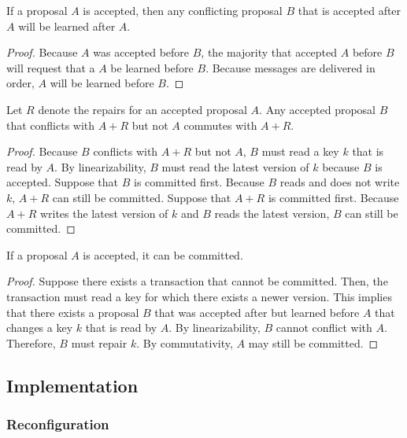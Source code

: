 \documentclass[../main.tex]{subfiles}
\begin{document}
  \begin{theorem}[Linearizability]
    If a proposal $A$ is accepted, then any conflicting proposal $B$ that is accepted after $A$ will
    be learned after $A$.
  \end{theorem}
  \begin{proof}
    Because $A$ was accepted before $B$, the majority that accepted $A$ before $B$ will request that
    a $A$ be learned before $B$. Because messages are delivered in order, $A$ will be learned before
    $B$.
  \end{proof}

  \begin{theorem}[Commutativity]
    Let $R$ denote the repairs for an accepted proposal $A$. Any accepted proposal $B$ that
    conflicts with $A + R$ but not $A$ commutes with $A + R$.
  \end{theorem}
  \begin{proof}
    Because $B$ conflicts with $A + R$ but not $A$, $B$ must read a key $k$ that is read by $A$. By
    linearizability, $B$ must read the latest version of $k$ because $B$ is accepted. Suppose that
    $B$ is committed first. Because $B$ reads and does not write $k$, $A + R$ can still be
    committed. Suppose that $A + R$ is committed first. Because $A + R$ writes the latest version of
    $k$ and $B$ reads the latest version, $B$ can still be committed.
  \end{proof}

  \begin{theorem}[Consistency]
    If a proposal $A$ is accepted, it can be committed.
  \end{theorem}
  \begin{proof}
    Suppose there exists a transaction that cannot be committed. Then, the transaction must read a
    key for which there exists a newer version. This implies that there exists a proposal $B$ that
    was accepted after but learned before $A$ that changes a key $k$ that is read by $A$. By
    linearizability, $B$ cannot conflict with $A$. Therefore, $B$ must repair $k$. By commutativity,
    $A$ may still be committed.
  \end{proof}

  \subsection{Implementation}

    \subsubsection{Reconfiguration}
\end{document}
